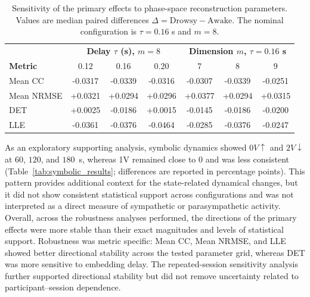 \begin{table}[t]
\centering
\caption{Sensitivity of the primary effects to phase-space reconstruction parameters. Values are median paired differences $\Delta=\mathrm{Drowsy}-\mathrm{Awake}$. The nominal configuration is $\tau=0.16$ s and $m=8$.}
\label{tab:parameter_sensitivity}
\footnotesize
\setlength{\tabcolsep}{3.5pt}
\renewcommand{\arraystretch}{1.08}
\begin{tabular}{lccc|ccc}
\toprule
& \multicolumn{3}{c}{\textbf{Delay $\tau$ (s), $m=8$}}
& \multicolumn{3}{c}{\textbf{Dimension $m$, $\tau=0.16$ s}} \\
\textbf{Metric}
& 0.12 & 0.16 & 0.20
& 7 & 8 & 9 \\
\midrule
Mean CC
& -0.0317 & -0.0339 & -0.0316
& -0.0307 & -0.0339 & -0.0251 \\
Mean NRMSE
& +0.0321 & +0.0294 & +0.0296
& +0.0377 & +0.0294 & +0.0315 \\
DET
& +0.0025 & -0.0186 & +0.0015
& -0.0145 & -0.0186 & -0.0200 \\
LLE
& -0.0361 & -0.0376 & -0.0464
& -0.0285 & -0.0376 & -0.0247 \\
\bottomrule
\end{tabular}
\end{table}

As an exploratory supporting analysis, symbolic dynamics showed $0V\uparrow$ and $2V\downarrow$ at $60$, $120$, and $180$~s, whereas 1V remained close to $0$ and was less consistent (Table~\ref{tab:symbolic_results}; differences are reported in percentage points). This pattern provides additional context for the state-related dynamical changes, but it did not show consistent statistical support across configurations and was not interpreted as a direct measure of sympathetic or parasympathetic activity. Overall, across the robustness analyses performed, the directions of the primary effects were more stable than their exact magnitudes and levels of statistical support. Robustness was metric specific: Mean CC, Mean NRMSE, and LLE showed better directional stability across the tested parameter grid, whereas DET was more sensitive to embedding delay. The repeated-session sensitivity analysis further supported directional stability but did not remove uncertainty related to participant--session dependence.

